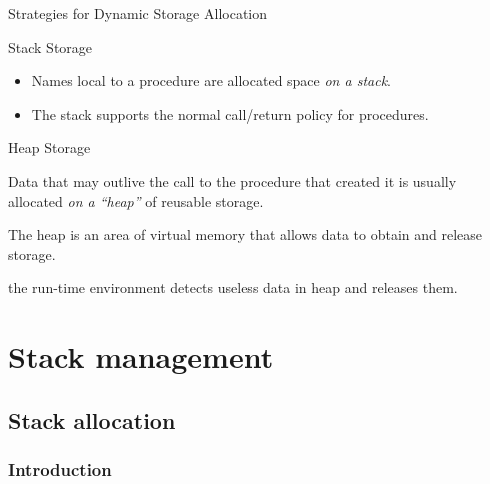 \begin{bibunit}[apalike]
\begin{frame}{Strategies for Dynamic Storage Allocation}
	\begin{block}{Stack Storage}
		\begin{itemize}
		\item Names local to a procedure are allocated space \emph{on a stack}.
		\item The stack supports the normal call/return policy for procedures.
		\end{itemize}
	\end{block}
	\vfill
	\begin{block}{Heap Storage}
		\begin{description}
		\item Data that may outlive the call to the procedure that created it is usually allocated \emph{on a ``heap''} of reusable storage.
		\item The heap is an area of virtual memory that allows data to obtain and release storage.
		\item[Garbage collection] the run-time environment detects useless data in heap and releases them.
		\end{description}
	\end{block}
\end{frame}

\section{Stack management}

\tableofcontentslide[sectionstyle={show/shaded},subsectionstyle={show/show/hide},subsubsectionstyle={hide/hide/hide/hide}]

\subsection{Stack allocation}

\subsubsection{Introduction}

\tableofcontentslide[sections={1-4},sectionstyle={show/shaded},subsectionstyle={show/shaded/hide},subsubsectionstyle={show/show/hide/hide}]


\end{bibunit}
